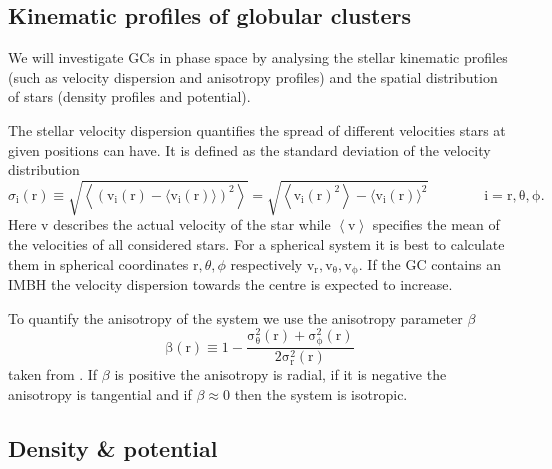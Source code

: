 \subsection{Kinematic profiles of globular clusters}\label{kin_prof_theory}
We will investigate \acp{GC} in phase space by analysing the stellar kinematic profiles (such as velocity dispersion and anisotropy profiles) and the spatial distribution of stars (density profiles and potential). 
\par The stellar velocity dispersion quantifies the spread of different velocities stars at given positions can have. It is defined as the standard deviation of the velocity distribution  
\begin{equation}\label{eq:vel_disp}
\sigma_\mathrm{i}(\mathrm{r})\equiv\sqrt{\left\langle(\mathrm{v_i}(\mathrm{r})-\langle \mathrm{v_i}(\mathrm{r})\rangle)^2\right\rangle}=\sqrt{\left\langle \mathrm{v_i}(\mathrm{r})^2\right\rangle-\langle \mathrm{v_i}(\mathrm{r})\rangle^2} \qquad\qquad \mathrm{i=r,\theta,\phi}.
\end{equation} Here v describes the actual velocity of the star while \(\left\langle \mathrm{v}\right\rangle\) specifies the mean of the velocities of all considered stars. For a spherical system it is best to calculate them in spherical coordinates \(\mathrm{r},\theta,\phi\) respectively \(\mathrm{v_r,v_{\theta},v_{\phi}}\). If the \ac{GC} contains an \ac{IMBH} the velocity dispersion towards the centre is expected to increase. 
\par To quantify the anisotropy of the system we use the anisotropy parameter \(\beta\) 
\begin{equation}\label{eq:anisotropy}
\mathrm{\beta(r)\equiv1-\frac{\sigma_\theta ^2(r)+\sigma_\phi ^2(r)}{2\sigma_r ^2(r)}}
\end{equation} taken from \citep[eq. 4.61]{2008gady.book.....B}. If \(\beta\) is positive the anisotropy is radial, if it is negative the anisotropy is tangential and if \(\beta\approx0\) then the system is isotropic.
\subsection{Density \& potential}\label{dens_pot_theory}
